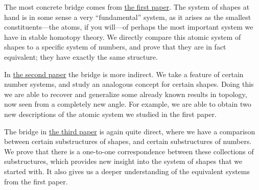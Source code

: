 The most concrete bridge comes from {\hyperref[ch1]{the first paper}}. The system of shapes at hand is in some sense a very ``fundamental'' system, as it arises as the smallest constituents---the atoms, if you will---of perhaps the most important system we have in stable homotopy theory. We directly compare this atomic system of shapes to a specific system of numbers, and prove that they are in fact equivalent; they have exactly the same structure. 

In {\hyperref[ch2]{the second paper}} the bridge is more indirect. We take a feature of certain number systems, and study an analogous concept for certain shapes. Doing this we are able to recover and generalize some already known results in topology, now seen from a completely new angle. For example, we are able to obtain two new descriptions of the atomic system we studied in the first paper. 

The bridge in {\hyperref[ch3]{the third paper}} is again quite direct, where we have a comparison between certain substructures of shapes, and certain substructures of numbers. We prove that there is a one-to-one correspondence between these collections of substructures, which provides new insight into the system of shapes that we started with. It also gives us a deeper understanding of the equivalent systems from the first paper. 